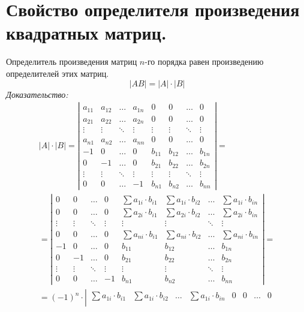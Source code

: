 \documentclass[12pt, fleqn]{article}
\begin{document}
\section{Свойство определителя произведения квадратных матриц.}
Определитель произведения матриц $n$-го порядка равен произведению определителей этих матриц.
$$\left|AB\right| =\left|A\right|\cdot\left|B\right|$$
\textit{Доказательство:}
\begin{multline*}
	\left|A\right|\cdot\left|B\right| =\left|
		\begin{matrix}
			a_{11} & a_{12} & \ldots & a_{1n} & 0 & 0 &\ldots & 0\\
			a_{21} & a_{22} & \ldots & a_{2n} & 0 & 0 &\ldots & 0\\
			\vdots & \vdots & \ddots & \vdots& \vdots& \vdots& \ddots&\vdots\\
			a_{n1} & a_{n2} & \ldots & a_{nn} & 0 & 0 &\ldots & 0\\
			-1 & 0 & \ldots & 0& b_{11} &b_{12}&\ldots& b_{1n}\\
			0& -1 & \ldots & 0& b_{21}&b_{22}&\ldots &b_{2n}\\
			\vdots & \vdots & \ddots & \vdots& \vdots& \vdots& \ddots& \vdots\\
			0 & 0 & \ldots & -1 & b_{n1}&b_{n2}&\ldots & b_{nn}  
		\end{matrix}
	\right|=\\
	=\left|
	\begin{matrix}
		0 & 0 &\ldots & 0 &\sum a_{1i}\cdot b_{i1}&\sum a_{1i}\cdot b_{i2}&\ldots&\sum a_{1i}\cdot b_{in}\\
		0 & 0 &\ldots & 0 &\sum a_{2i}\cdot b_{i1}&\sum a_{2i}\cdot b_{i2}&\ldots&\sum a_{2i}\cdot b_{in}\\
		\vdots & \vdots & \ddots & \vdots& \vdots& \vdots& \ddots&\vdots\\
		0 & 0 &\ldots & 0 &\sum a_{ni}\cdot b_{i1}&\sum a_{ni}\cdot b_{i2}&\ldots&\sum a_{ni}\cdot b_{in}\\
		-1 & 0 & \ldots & 0& b_{11} &b_{12}&\ldots& b_{1n}\\
		0& -1 & \ldots & 0& b_{21}&b_{22}&\ldots &b_{2n}\\
		\vdots & \vdots & \ddots & \vdots& \vdots& \vdots& \ddots& \vdots\\
		0 & 0 & \ldots & -1 & b_{n1}&b_{n2}&\ldots & b_{nn}  
	\end{matrix}
	\right|=\\
		=\left(-1\right)^n\cdot\left|
	\begin{matrix}
		\sum a_{1i}\cdot b_{i1}&\sum a_{1i}\cdot b_{i2}&\ldots&\sum a_{1i}\cdot b_{in}& 0 & 0 &\ldots & 0 \\

\end{matrix}
\end{multline*}
\end{document}

